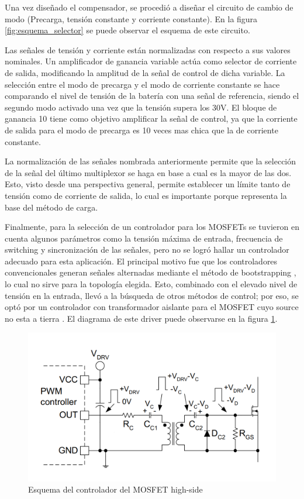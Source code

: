 Una vez diseñado el compensador, se procedió a diseñar el circuito de cambio de modo (Precarga, tensión constante y corriente constante).
En la figura \ref{fig:esquema_selector} se puede observar el esquema de este circuito.

Las señales de tensión y corriente están normalizadas con respecto a sus valores nominales.
Un amplificador de ganancia variable actúa como selector de corriente de salida,
modificando la amplitud de la señal de control de dicha variable.
La selección entre el modo de precarga y el modo de corriente constante se hace comparando el nivel de tensión de la batería
con una señal de referencia, siendo el segundo modo activado una vez que la tensión supera los 30V.
El bloque de ganancia 10 tiene como objetivo amplificar la señal de control, ya que la corriente de salida para el modo
de precarga es 10 veces mas chica que la de corriente constante.

La normalización de las señales nombrada anteriormente permite que la selección de la señal del último multiplexor
se haga en base a cual es la mayor de las dos. Esto, visto desde una perspectiva general, permite establecer un límite
tanto de tensión como de corriente de salida, lo cual es importante porque representa la base del método de carga.

Finalmente, para la selección de un controlador para los MOSFETs se tuvieron en cuenta algunos parámetros como
la tensión máxima de entrada, frecuencia de switching y sincronización de las señales,
pero no se logró hallar un controlador adecuado para esta aplicación.
El principal motivo fue que los controladores convencionales generan señales alternadas mediante el método de bootstrapping \cite{hart},
lo cual no sirve para la topología elegida. Esto, combinado con el elevado nivel de tensión en la entrada,
llevó a la búsqueda de otros métodos de control; por eso, se optó por un controlador con transformador aislante para el MOSFET cuyo source no esta a tierra \cite{gatedrivers}. El diagrama de este driver puede observarse en la figura \ref{fig:driver}.

\begin{figure}
    \centering
    \includegraphics[width=\textwidth]{images/esquema_driver.png}
    \caption{Esquema del controlador del MOSFET high-side}
    \label{fig:driver}
\end{figure}

